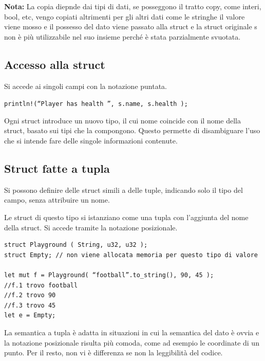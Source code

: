 \noindent
\begin{tcolorbox}
  \textbf{Nota:} La copia diepnde dai tipi di dati, se posseggono il tratto copy,
  come interi, bool, etc, vengo copiati altrimenti per gli altri dati come le stringhe il
  valore viene mosso e il possesso del dato viene passato alla struct e la
  struct originale s non è più utilizzabile nel suo insieme perché è stata
  parzialmente svuotata.
\end{tcolorbox}


\subsection{Accesso alla struct}

Si accede ai singoli campi con la notazione puntata.

\begin{center}
  \centering
  \texttt{println!(“Player {} has health {}”, s.name, s.health );}
\end{center}

Ogni struct introduce un nuovo tipo, il cui nome coincide con il nome della
struct, basato sui tipi che la compongono. Questo permette di disambiguare
l'uso che si intende fare delle singole informazioni contenute.

\subsection{Struct fatte a tupla}

Si possono definire delle struct simili a delle tuple, indicando solo il tipo del campo,
senza attribuire un nome.

Le struct di questo tipo si istanziano come una tupla con l'aggiunta del nome
della struct. Si accede tramite la notazione posizionale.


\begin{verbatim}
struct Playground ( String, u32, u32 );
struct Empty; // non viene allocata memoria per questo tipo di valore

let mut f = Playground( “football”.to_string(), 90, 45 );
//f.1 trovo football
//f.2 trovo 90
//f.3 trovo 45
let e = Empty;  
\end{verbatim}

La semantica a tupla è adatta in situazioni in cui la semantica del dato è ovvia
e la notazione posizionale risulta più comoda, come ad esempio le coordinate di un punto.
Per il resto, non vi è differenza se non la leggibilità del codice.

